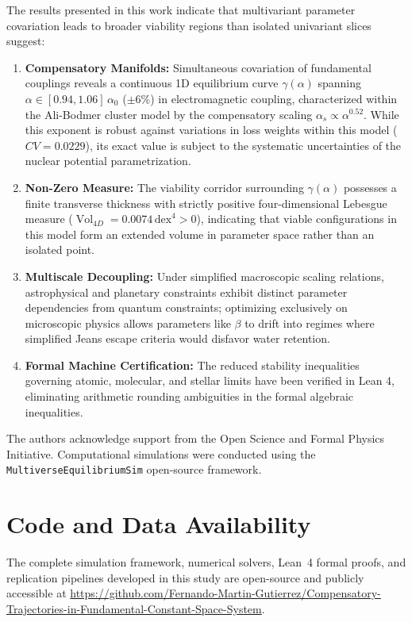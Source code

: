 \documentclass[aps,prd,twocolumn,superscriptaddress,nofootinbib,floatfix]{revtex4-2}
\begin{document}
The results presented in this work indicate that multivariant parameter covariation leads to broader viability regions than isolated univariant slices suggest:
\begin{enumerate}
    \item \textbf{Compensatory Manifolds:} Simultaneous covariation of fundamental couplings reveals a continuous 1D equilibrium curve $\gamma(\alpha)$ spanning $\alpha \in [0.94, 1.06]\,\alpha_0$ ($\pm 6\%$) in electromagnetic coupling, characterized within the Ali-Bodmer cluster model by the compensatory scaling $\alpha_s \propto \alpha^{0.52}$. While this exponent is robust against variations in loss weights within this model ($CV = 0.0229$), its exact value is subject to the systematic uncertainties of the nuclear potential parametrization.
    \item \textbf{Non-Zero Measure:} The viability corridor surrounding $\gamma(\alpha)$ possesses a finite transverse thickness with strictly positive four-dimensional Lebesgue measure ($\operatorname{Vol}_{4D} = 0.0074\,\text{dex}^4 > 0$), indicating that viable configurations in this model form an extended volume in parameter space rather than an isolated point.
    \item \textbf{Multiscale Decoupling:} Under simplified macroscopic scaling relations, astrophysical and planetary constraints exhibit distinct parameter dependencies from quantum constraints; optimizing exclusively on microscopic physics allows parameters like $\beta$ to drift into regimes where simplified Jeans escape criteria would disfavor water retention.
    \item \textbf{Formal Machine Certification:} The reduced stability inequalities governing atomic, molecular, and stellar limits have been verified in Lean 4, eliminating arithmetic rounding ambiguities in the formal algebraic inequalities.
\end{enumerate}

\begin{acknowledgments}
The authors acknowledge support from the Open Science and Formal Physics Initiative. Computational simulations were conducted using the \texttt{MultiverseEquilibriumSim} open-source framework.
\end{acknowledgments}

\section*{Code and Data Availability}
The complete simulation framework, numerical solvers, Lean~4 formal proofs, and replication pipelines developed in this study are open-source and publicly accessible at \url{https://github.com/Fernando-Martin-Gutierrez/Compensatory-Trajectories-in-Fundamental-Constant-Space-System}.


\end{document}
